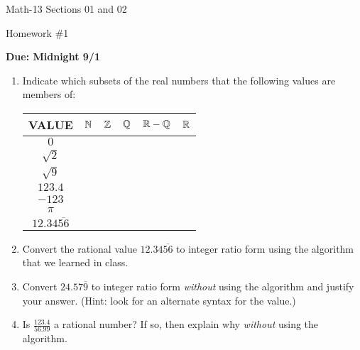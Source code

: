 \documentclass[letterpaper,12pt,fleqn]{article}
\begin{document}
\begin{center}
  \large
  Math-13 Sections 01 and 02

  \Large
  Homework \#1

  \large
  \textbf{Due: Midnight 9/1}
\end{center}

\begin{enumerate}
  \setlength\itemsep{5ex}
\item Indicate which subsets of the real numbers that the following values are members of:

  \bigskip

  \begin{center}
    \renewcommand{\arraystretch}{1.2}
    \begin{tabular}{|c||c|c|c|c|c|}
      \hline
      VALUE & \(\mathbb{N}\) & \(\mathbb{Z}\) & \(\mathbb{Q}\) & \(\mathbb{R}-\mathbb{Q}\) & \(\mathbb{R}\) \\
      \hline
      \hline
      \(0\) & & & & & \\
      \hline
      \(\sqrt{2}\) & & & & & \\
      \hline
      \(\sqrt{9}\) & & & & & \\
      \hline
      \(123.4\) & & & & & \\
      \hline
      \(-123\) & & & & & \\
      \hline
      \(\pi\) & & & & & \\
      \hline
      \(12.34\overline{56}\) & & & & & \\
      \hline
    \end{tabular}
  \end{center}

  \bigskip

\item Convert the rational value \(12.34\overline{56}\) to integer ratio form using the algorithm that we learned
  in class.

\item Convert \(24.57\overline{9}\) to integer ratio form \emph{without} using the algorithm and justify your
  answer.  (Hint: look for an alternate syntax for the value.)

\item Is \(\displaystyle\frac{123.4}{56.99}\) a rational number?  If so, then explain why \emph{without} using the
  algorithm.
\end{enumerate}
\end{document}
